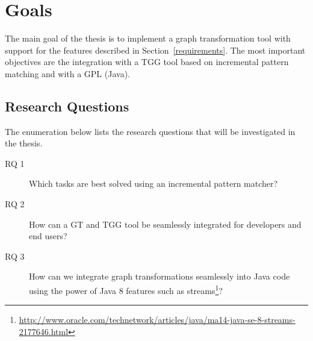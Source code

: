 \chapter{Goals}
\label{goals}
The main goal of the thesis is to implement a graph transformation tool with support for the features described in Section~\ref{requirements}.
The most important objectives are the integration with a TGG tool based on incremental pattern matching and with a GPL (Java).

\section{Research Questions}
\label{research-questions}
The enumeration below lists the research questions that will be investigated in the thesis.
\begin{description}
	\item[RQ 1]
		Which tasks are best solved using an incremental pattern matcher?
	\item[RQ 2]
		How can a GT and TGG tool be seamlessly integrated for developers and end users?
	\item[RQ 3]
		How can we integrate graph transformations seamlessly into Java code using the power of Java 8 features such as streams\footnote{\url{http://www.oracle.com/technetwork/articles/java/ma14-java-se-8-streams-2177646.html}}?
\end{description}

